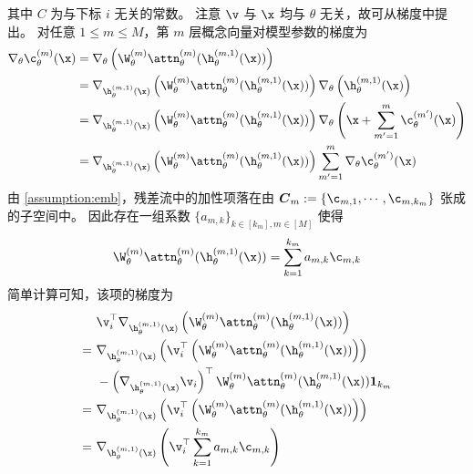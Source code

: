 其中 $C$ 为与下标 $i$ 无关的常数。
注意 $\v$ 与 $\x$ 均与 $\theta$ 无关，故可从梯度中提出。
对任意 $1 \leq m \leq M$，第 $m$ 层概念向量对模型参数的梯度为
\begin{equation}\label{eq:gradient concept vector layer m}
\begin{aligned}
    \nabla_{\theta} \c^{(m)}_{\theta}(\x) 
    &= \nabla_{\theta} \left( \W^{(m)}_{\theta} \attn^{(m)}_{\theta}(\h_{\theta}^{(m,1)}(\x)) \right)\\
    &= \nabla_{\h_{\theta}^{(m,1)}(\x)} \left( \W^{(m)}_{\theta} \attn^{(m)}_{\theta}(\h_{\theta}^{(m,1)}(\x)) \right) \nabla_{\theta} \left( \h_{\theta}^{(m,1)}(\x) \right) \\
    &= \nabla_{\h_{\theta}^{(m,1)}(\x)} \left( \W^{(m)}_{\theta} \attn^{(m)}_{\theta}(\h_{\theta}^{(m,1)}(\x)) \right) \nabla_{\theta} \left( \x + \sum_{m^{\prime}=1}^{m} \c^{(m^{\prime})}_{\theta}(\x) \right) \\
    &= \nabla_{\h_{\theta}^{(m,1)}(\x)} \left( \W^{(m)}_{\theta} \attn^{(m)}_{\theta}(\h_{\theta}^{(m,1)}(\x)) \right) \sum_{m^{\prime}=1}^{m} \nabla_{\theta} \c^{(m^{\prime})}_{\theta}(\x)
\end{aligned}
\end{equation}
由 \cref{assumption:emb}，残差流中的加性项落在由 $\boldsymbol{C}_m := \{ \c_{m,1}, \cdots, \c_{m,k_m} \}$ 张成的子空间中。
因此存在一组系数 $\{ a_{m,k} \}_{k\in [k_m], m \in [M]}$ 使得
\begin{equation}\label{eq:gradient additive term alternative}
    \W^{(m)}_{\theta} \attn^{(m)}_{\theta}(\h_{\theta}^{(m,1)}(\x)) = \sum_{k=1}^{k_m} a_{m,k} \c_{m,k}
\end{equation}
简单计算可知，该项的梯度为
\begin{equation}\label{eq:gradient additive term alternative 2}
\begin{aligned}
    & \v_i^{\top} \nabla_{\h_{\theta}^{(m,1)}(\x)} \left( \W^{(m)}_{\theta} \attn^{(m)}_{\theta}(\h_{\theta}^{(m,1)}(\x)) \right) \\
    =\ & \nabla_{\h_{\theta}^{(m,1)}(\x)} \left( \v_i^{\top} \left(\W^{(m)}_{\theta} \attn^{(m)}_{\theta}(\h_{\theta}^{(m,1)}(\x)) \right) \right) \\
    &- \left( \nabla_{\h_{\theta}^{(m,1)}(\x)} \v_i \right)^{\top} \W^{(m)}_{\theta} \attn^{(m)}_{\theta}(\h_{\theta}^{(m,1)}(\x)) \mathbf{1}_{k_m} \\
    =\ & \nabla_{\h_{\theta}^{(m,1)}(\x)} \left( \v_i^{\top} \left(\W^{(m)}_{\theta} \attn^{(m)}_{\theta}(\h_{\theta}^{(m,1)}(\x)) \right) \right) \\
    =\ & \nabla_{\h_{\theta}^{(m,1)}(\x)} \left( \v_i^{\top} \sum_{k=1}^{k_m} a_{m,k} \c_{m,k} \right)
\end{aligned}
\end{equation}

